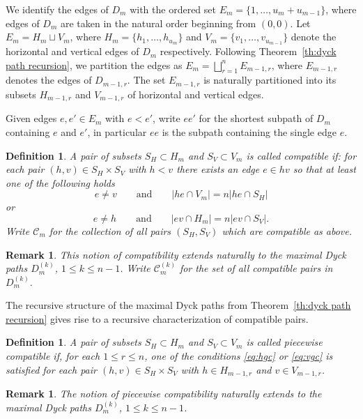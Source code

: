 \documentclass{amsart}
\newtheorem{definition}[theorem]{Definition}
\newtheorem{remark}[theorem]{Remark}
\numberwithin{equation}{section}
\newcommand{\cC}{\mathcal{C}}
\begin{document}
We identify the edges of $D_m$ with the ordered set $E_m=\{1,\ldots,u_m+u_{m-1}\}$, where edges of $D_m$ are taken in the natural order beginning from $(0,0)$.
Let $E_m=H_m\sqcup V_m$, where $H_m=\{h_1,\ldots,h_{u_m}\}$ and $V_m=\{v_1,\ldots,v_{u_{m-1}}\}$ denote the horizontal and vertical edges of $D_m$ respectively.
Following Theorem~\ref{th:dyck path recursion}, we partition the edges as $E_m=\bigsqcup_{r=1}^n E_{m-1,r}$, where $E_{m-1,r}$ denotes the edges of $D_{m-1,r}$.
The set $E_{m-1,r}$ is naturally partitioned into its subsets $H_{m-1,r}$ and $V_{m-1,r}$ of horizontal and vertical edges.

Given edges $e,e'\in E_m$ with $e<e'$, write $ee'$ for the shortest subpath of $D_m$ containing $e$ and $e'$, in particular $ee$ is the subpath containing the single edge $e$.
\begin{definition}
  \label{def:compatibility}
  A pair of subsets $S_H\subset H_m$ and $S_V\subset V_m$ is called \emph{compatible} if: 
  for each pair $(h,v)\in S_H\times S_V$ with $h<v$ there exists an edge $e\in hv$ so that at least one of the following holds
  \begin{equation}
    \label{eq:hgc}
    e\ne v\qquad\text{and}\qquad |he\cap V_m|=n|he\cap S_H|
  \end{equation}
  or
  \begin{equation}
    \label{eq:vgc}
    e\ne h\qquad\text{and}\qquad |ev\cap H_m|=n|ev\cap S_V|.
  \end{equation}
  Write $\cC_m$ for the collection of all pairs $(S_H,S_V)$ which are compatible as above.
\end{definition}
\begin{remark}
  This notion of compatibility extends naturally to the maximal Dyck paths $D_m^{(k)}$, $1\le k\le n-1$.  Write $\cC_m^{(k)}$ for the set of all compatible pairs in $D_m^{(k)}$.
\end{remark}

The recursive structure of the maximal Dyck paths from Theorem~\ref{th:dyck path recursion} gives rise to a recursive characterization of compatible pairs.
\begin{definition}
  \cite[Definition 3.11]{rupel}
  \label{def:piecewise compatibility}
  A pair of subsets $S_H\subset H_m$ and $S_V\subset V_m$ is called \emph{piecewise compatible} if, for each $1\le r\le n$, one of the conditions \eqref{eq:hgc} or \eqref{eq:vgc} is satisfied for each pair $(h,v)\in S_H\times S_V$ with $h\in H_{m-1,r}$ and $v\in V_{m-1,r}$.
\end{definition}
\begin{remark}
  The notion of piecewise compatibility naturally extends to the maximal Dyck paths $D_m^{(k)}$, $1\le k\le n-1$.
\end{remark}
\end{document}
